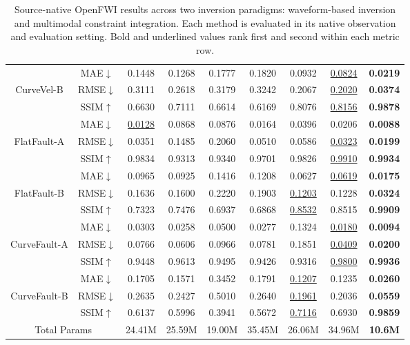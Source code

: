 \documentclass[letterpaper]{article}
\begin{document}
\begin{table}[t]
\begin{tabular*}{\textwidth}{@{\extracolsep{\fill}}c c c c c c c c c@{}}
		& MAE$\downarrow$ & 0.1448 & 0.1268 & 0.1777 & 0.1820 & 0.0932 & \underline{0.0824} & \textbf{0.0219} \\
		CurveVel-B & RMSE$\downarrow$ & 0.3111 & 0.2618 & 0.3179 & 0.3242 & 0.2067 & \underline{0.2020} & \textbf{0.0374} \\
		& SSIM$\uparrow$ & 0.6630 & 0.7111 & 0.6614 & 0.6169 & 0.8076 & \underline{0.8156} & \textbf{0.9878} \\
		\midrule
		& MAE$\downarrow$ & \underline{0.0128} & 0.0868 & 0.0876 & 0.0164 & 0.0396 & 0.0206 & \textbf{0.0088} \\
		FlatFault-A & RMSE$\downarrow$ & 0.0351 & 0.1485 & 0.2060 & 0.0510 & 0.0586 & \underline{0.0323} & \textbf{0.0199} \\
		& SSIM$\uparrow$ & 0.9834 & 0.9313 & 0.9340 & 0.9701 & 0.9826 & \underline{0.9910} & \textbf{0.9934} \\
		\addlinespace[2pt]
		& MAE$\downarrow$ & 0.0965 & 0.0925 & 0.1416 & 0.1208 & 0.0627 & \underline{0.0619} & \textbf{0.0175} \\
		FlatFault-B & RMSE$\downarrow$ & 0.1636 & 0.1600 & 0.2220 & 0.1903 & \underline{0.1203} & 0.1228 & \textbf{0.0324} \\
		& SSIM$\uparrow$ & 0.7323 & 0.7476 & 0.6937 & 0.6868 & \underline{0.8532} & 0.8515 & \textbf{0.9909} \\
		\midrule
		& MAE$\downarrow$ & 0.0303 & 0.0258 & 0.0500 & 0.0277 & 0.1324 & \underline{0.0180} & \textbf{0.0094} \\
		CurveFault-A & RMSE$\downarrow$ & 0.0766 & 0.0606 & 0.0966 & 0.0781 & 0.1851 & \underline{0.0409} & \textbf{0.0200} \\
		& SSIM$\uparrow$ & 0.9448 & 0.9613 & 0.9495 & 0.9426 & 0.9316 & \underline{0.9800} & \textbf{0.9936} \\
		\addlinespace[2pt]
		& MAE$\downarrow$ & 0.1705 & 0.1571 & 0.3452 & 0.1791 & \underline{0.1207} & 0.1235 & \textbf{0.0260} \\
		CurveFault-B & RMSE$\downarrow$ & 0.2635 & 0.2427 & 0.5010 & 0.2640 & \underline{0.1961} & 0.2036 & \textbf{0.0559} \\
		& SSIM$\uparrow$ & 0.6137 & 0.5996 & 0.3941 & 0.5672 & \underline{0.7116} & 0.6930 & \textbf{0.9859} \\
		\midrule
		\multicolumn{2}{c}{Total Params} & 24.41M & 25.59M & 19.00M & 35.45M & 26.06M & 34.96M & \textbf{10.6M} \\
		\bottomrule
	\end{tabular*}
	\caption{Source-native OpenFWI results across two inversion paradigms: waveform-based inversion and multimodal constraint integration. Each method is evaluated in its native observation and evaluation setting. Bold and underlined values rank first and second within each metric row.}
	\label{tab:main-comparison}
\end{table}
\end{document}
